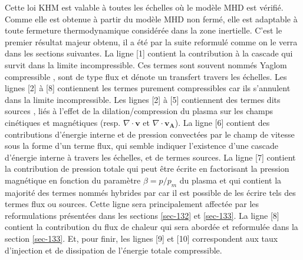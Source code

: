 Cette loi \acs{KHM} est valable à toutes les échelles où le modèle \ac{MHD} est vérifié. Comme elle est obtenue à partir du modèle \ac{MHD} non fermé, elle est adaptable à toute fermeture thermodynamique considérée dans la zone inertielle. C'est le premier résultat majeur obtenu, il a été par la suite reformulé comme on le verra dans les sections suivantes. La ligne [1] contient la contribution à la cascade qui survit dans la limite incompressible. Ces termes sont souvent nommés \og Yaglom compressible \fg{}, sont de type flux et dénote un transfert travers les échelles. Les lignes [2] à [8] contiennent les termes purement compressibles car ils s'annulent dans la limite incompressible. Les lignes [2] à [5] contiennent des termes dits \og sources \fg{}, liés à l'effet de la dilation/compression du plasma sur les champs cinétiques et magnétiques (resp. $\nabla \cdot \boldsymbol{v}$ et $\nabla \cdot \boldsymbol{v_A}$). La ligne [6] contient des contributions d'énergie interne et de pression convectées par le champ de vitesse sous la forme d'un terme flux, qui semble indiquer l'existence d'une cascade d'énergie interne à travers les échelles, et de termes sources. La ligne [7] contient la contribution de pression totale qui peut être écrite en factorisant la pression magnétique en fonction du paramètre $\beta = p/p_m$ du plasma et qui contient la majorité des termes nommés \og hybrides \fg{} par \cite{andres_alternative_2017} car il est possible de les écrire tels des termes flux ou sources. Cette ligne sera principalement affectée par les reformulations présentées dans les sections \ref{sec-132} et \ref{sec-133}. La ligne [8] contient la contribution du flux de chaleur qui sera abordée et reformulée dans la section \ref{sec-133}. Et, pour finir, les lignes [9] et [10] correspondent aux taux d'injection et de dissipation de l'énergie totale compressible. 

